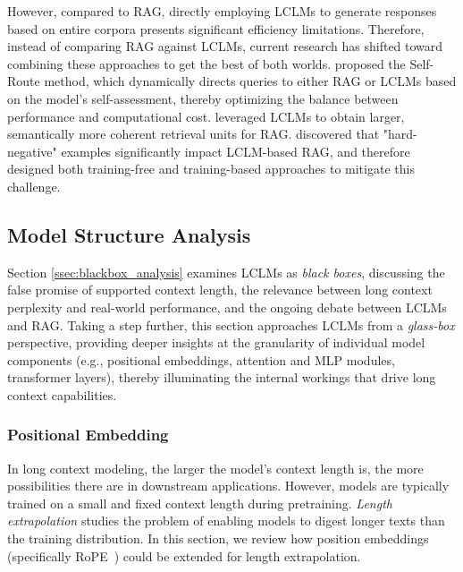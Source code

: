 \documentclass[11pt, a4paper, logo, copyright, nonumbering]{map}
\begin{document}
However, compared to RAG, directly employing LCLMs to generate responses based on entire corpora presents significant efficiency limitations. Therefore, instead of comparing RAG against LCLMs, current research has shifted toward combining these approaches to get the best of both worlds. \citet{li2024retrieval} proposed the Self-Route method, which dynamically directs queries to either RAG or LCLMs based on the model's self-assessment, thereby optimizing the balance between performance and computational cost. \citet{jiang2024longrag} leveraged LCLMs to obtain larger, semantically more coherent retrieval units for RAG. \citet{DBLP:journals/corr/abs-2410-05983} discovered that "hard-negative" examples significantly impact LCLM-based RAG, and therefore designed both training-free and training-based approaches to mitigate this challenge.























\subsection{Model Structure Analysis}

Section \ref{ssec:blackbox_analysis} examines LCLMs as \textit{black boxes}, discussing the false promise of supported context length, the relevance between long context perplexity and real-world performance, and the ongoing debate between LCLMs and RAG. Taking a step further, this section approaches LCLMs from a \textit{glass-box} perspective, providing deeper insights at the granularity of individual model components (e.g., positional embeddings, attention and MLP modules, transformer layers), thereby illuminating the internal workings that drive long context capabilities.
\subsubsection{Positional Embedding} 

In long context modeling, the larger the model's context length is, the more possibilities there are in downstream applications. However, models are typically trained on a small and fixed context length during pretraining. \textit{Length extrapolation} studies the problem of enabling models to digest longer texts than the training distribution. In this section, we review how position embeddings (specifically RoPE~\citep{su2024roformer}) could be extended for length extrapolation.
\end{document}
